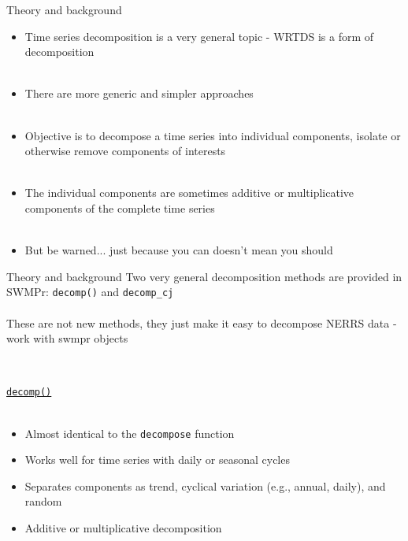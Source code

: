 \documentclass[xcolor=dvipsnames,serif]{beamer}\usepackage[]{graphicx}\usepackage[]{color}
\begin{document}
\begin{frame}{Theory and background}
\begin{itemize}
\item<1-> Time series decomposition is a very general topic - WRTDS is a form of decomposition \\~\\
\item<2-> There are more generic and simpler approaches \\~\\
\item<3-> Objective is to decompose a time series into individual components, isolate or otherwise remove components of interests \\~\\
\item<4-> The individual components are sometimes additive or multiplicative components of the complete time series \\~\\
\item<5-> But be warned... just because you can doesn't mean you should
\end{itemize}
\end{frame}

\begin{frame}[t]{Theory and background}
Two very general decomposition methods are provided in SWMPr: \texttt{decomp()} and \texttt{decomp_cj} \\~\\
These are not new methods, they just make it easy to decompose NERRS data - work with swmpr objects \\~\\
\begin{columns}[t]
\begin{column}{\textwidth}
\underline{\texttt{decomp()}} \\~\\
\begin{itemize}
\item<2-> Almost identical to the \texttt{decompose} function
\item<3-> Works well for time series with daily or seasonal cycles
\item<4-> Separates components as trend, cyclical variation (e.g., annual, daily), and random
\item<5-> Additive or multiplicative decomposition
\end{itemize}
\end{column}
\end{columns}
\end{frame}
\end{document}
